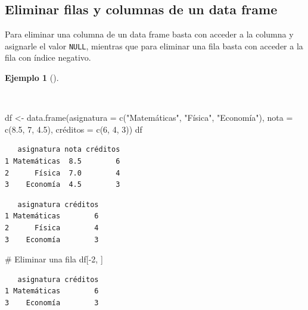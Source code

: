\documentclass[
  spanish,
  a4paper,
]{scrreport}
\newenvironment{Shaded}{\begin{snugshade}}{\end{snugshade}}
\newcommand{\AttributeTok}[1]{\textcolor[rgb]{0.40,0.45,0.13}{#1}}
\newcommand{\CommentTok}[1]{\textcolor[rgb]{0.37,0.37,0.37}{#1}}
\newcommand{\ConstantTok}[1]{\textcolor[rgb]{0.56,0.35,0.01}{#1}}
\newcommand{\DecValTok}[1]{\textcolor[rgb]{0.68,0.00,0.00}{#1}}
\newcommand{\FloatTok}[1]{\textcolor[rgb]{0.68,0.00,0.00}{#1}}
\newcommand{\FunctionTok}[1]{\textcolor[rgb]{0.28,0.35,0.67}{#1}}
\newcommand{\NormalTok}[1]{\textcolor[rgb]{0.00,0.23,0.31}{#1}}
\newcommand{\OtherTok}[1]{\textcolor[rgb]{0.00,0.23,0.31}{#1}}
\newcommand{\SpecialCharTok}[1]{\textcolor[rgb]{0.37,0.37,0.37}{#1}}
\newcommand{\StringTok}[1]{\textcolor[rgb]{0.13,0.47,0.30}{#1}}
\theoremstyle{definition}
\theoremstyle{definition}
\newtheorem{example}{Ejemplo}[chapter]
\theoremstyle{remark}
\begin{document}
\subsection{Eliminar filas y columnas de un data
frame}\label{eliminar-filas-y-columnas-de-un-data-frame}

Para eliminar una columna de un data frame basta con acceder a la
columna y asignarle el valor \texttt{NULL}, mientras que para eliminar
una fila basta con acceder a la fila con índice negativo.

\begin{example}[]\protect\hypertarget{exm-eliminacion-filas-columnas-data-frame}{}\label{exm-eliminacion-filas-columnas-data-frame}

~

\begin{Shaded}
\begin{Highlighting}[]
\NormalTok{df }\OtherTok{\textless{}{-}} \FunctionTok{data.frame}\NormalTok{(}\AttributeTok{asignatura =} \FunctionTok{c}\NormalTok{(}\StringTok{"Matemáticas"}\NormalTok{, }\StringTok{"Física"}\NormalTok{, }\StringTok{"Economía"}\NormalTok{), }\AttributeTok{nota =} \FunctionTok{c}\NormalTok{(}\FloatTok{8.5}\NormalTok{, }\DecValTok{7}\NormalTok{, }\FloatTok{4.5}\NormalTok{), créditos }\OtherTok{=} \FunctionTok{c}\NormalTok{(}\DecValTok{6}\NormalTok{, }\DecValTok{4}\NormalTok{, }\DecValTok{3}\NormalTok{))}
\NormalTok{df}
\end{Highlighting}
\end{Shaded}

\begin{verbatim}
   asignatura nota créditos
1 Matemáticas  8.5        6
2      Física  7.0        4
3    Economía  4.5        3
\end{verbatim}

\begin{Shaded}
\end{Shaded}

\begin{verbatim}
   asignatura créditos
1 Matemáticas        6
2      Física        4
3    Economía        3
\end{verbatim}

\begin{Shaded}
\begin{Highlighting}[]
\CommentTok{\# Eliminar una fila}
\NormalTok{df[}\SpecialCharTok{{-}}\DecValTok{2}\NormalTok{, ]}
\end{Highlighting}
\end{Shaded}

\begin{verbatim}
   asignatura créditos
1 Matemáticas        6
3    Economía        3
\end{verbatim}

\end{example}
\end{document}
